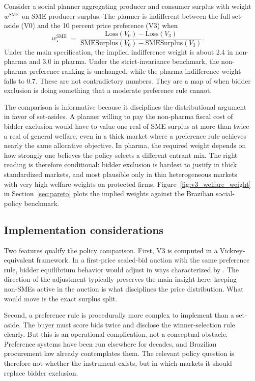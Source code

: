 Consider a social planner aggregating producer and consumer surplus with weight $w^{\text{SME}}$ on SME producer surplus. The planner is indifferent between the full set-aside (V0) and the 10 percent price preference (V3) when
\begin{equation}
w^{\text{SME}}_\star
\;=\; \frac{\mathrm{Loss}(V_0) - \mathrm{Loss}(V_3)}
           {\mathrm{SMESurplus}(V_0) - \mathrm{SMESurplus}(V_3)}.
\end{equation}
Under the main specification, the implied indifference weight is about 2.4 in non-pharma and 3.0 in pharma. Under the strict-invariance benchmark, the non-pharma preference ranking is unchanged, while the pharma indifference weight falls to 0.7. These are not contradictory numbers. They are a map of when bidder exclusion is doing something that a moderate preference rule cannot.

The comparison is informative because it disciplines the distributional argument in favor of set-asides. A planner willing to pay the non-pharma fiscal cost of bidder exclusion would have to value one real of SME surplus at more than twice a real of general welfare, even in a thick market where a preference rule achieves nearly the same allocative objective. In pharma, the required weight depends on how strongly one believes the policy selects a different entrant mix. The right reading is therefore conditional: bidder exclusion is hardest to justify in thick standardized markets, and most plausible only in thin heterogeneous markets with very high welfare weights on protected firms. Figure~\ref{fig:v3_welfare_weight} in Section~\ref{sec:pareto} plots the implied weights against the Brazilian social-policy benchmark.

\subsection{Implementation considerations}

Two features qualify the policy comparison. First, V3 is computed in a Vickrey-equivalent framework. In a first-price sealed-bid auction with the same preference rule, bidder equilibrium behavior would adjust in ways characterized by \citet{maskinriley2000}. The direction of the adjustment typically preserves the main insight here: keeping non-SMEs active in the auction is what disciplines the price distribution. What would move is the exact surplus split.

Second, a preference rule is procedurally more complex to implement than a set-aside. The buyer must score bids twice and disclose the winner-selection rule clearly. But this is an operational complication, not a conceptual obstacle. Preference systems have been run elsewhere for decades, and Brazilian procurement law already contemplates them. The relevant policy question is therefore not whether the instrument exists, but in which markets it should replace bidder exclusion.

